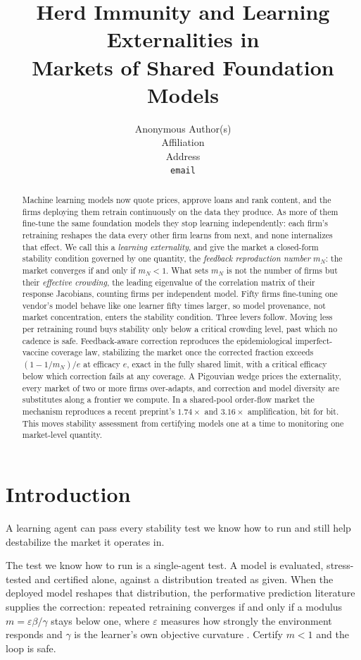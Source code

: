 \documentclass{article}
\title{Herd Immunity and Learning Externalities in\\ Markets of Shared Foundation Models}
\author{%
  Anonymous Author(s) \\
  Affiliation \\
  Address \\
  \texttt{email} \\
}
\theoremstyle{plain}
\theoremstyle{definition}
\newcommand{\mN}{m_N}
\begin{document}
\maketitle

\begin{abstract}
Machine learning models now quote prices, approve loans and rank content, and the firms deploying them retrain continuously on the data they produce. As more of them fine-tune the same foundation models they stop learning independently: each firm's retraining reshapes the data every other firm learns from next, and none internalizes that effect. We call this a \emph{learning externality}, and give the market a closed-form stability condition governed by one quantity, the \emph{feedback reproduction number} $\mN$: the market converges if and only if $\mN < 1$. What sets $\mN$ is not the number of firms but their \emph{effective crowding}, the leading eigenvalue of the correlation matrix of their response Jacobians, counting firms per independent model. Fifty firms fine-tuning one vendor's model behave like one learner fifty times larger, so model provenance, not market concentration, enters the stability condition. Three levers follow. Moving less per retraining round buys stability only below a critical crowding level, past which no cadence is safe. Feedback-aware correction reproduces the epidemiological imperfect-vaccine coverage law, stabilizing the market once the corrected fraction exceeds $(1-1/\mN)/e$ at efficacy $e$, exact in the fully shared limit, with a critical efficacy below which correction fails at any coverage. A Pigouvian wedge prices the externality, every market of two or more firms over-adapts, and correction and model diversity are substitutes along a frontier we compute. In a shared-pool order-flow market the mechanism reproduces a recent preprint's $1.74\times$ and $3.16\times$ amplification, bit for bit. This moves stability assessment from certifying models one at a time to monitoring one market-level quantity.
\end{abstract}

\section{Introduction}

A learning agent can pass every stability test we know how to run and still help destabilize the market it operates in.

The test we know how to run is a single-agent test. A model is evaluated, stress-tested and certified alone, against a distribution treated as given. When the deployed model reshapes that distribution, the performative prediction literature supplies the correction: repeated retraining converges if and only if a modulus $m = \varepsilon\beta/\gamma$ stays below one, where $\varepsilon$ measures how strongly the environment responds and $\gamma$ is the learner's own objective curvature \citep{perdomo2020}. Certify $m<1$ and the loop is safe.
\end{document}
